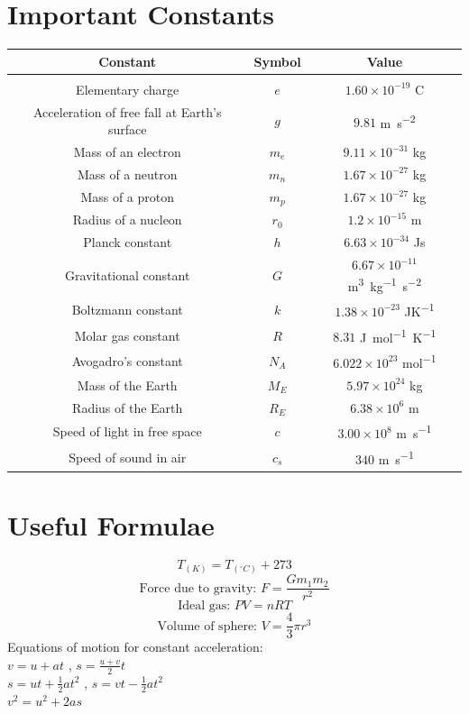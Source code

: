 \documentclass{exam}
\begin{document}
\section*{Important Constants}
\vspace{20pt}
\begin{tabular}{ c|c|c } 
    \textbf{Constant} & \textbf{Symbol} & \textbf{Value} \\ 
    \hline &&\\
    Elementary charge & $e$ & $1.60\times10^{-19}$ \si{C} \\
    Acceleration of free fall at Earth's surface & $g$ & $9.81$ \si{m.s^{-2}} \\
    Mass of an electron & $m_e$ & $9.11\times10^{-31}$ \si{kg} \\
    Mass of a neutron & $m_n$ & $1.67\times10^{-27}$ \si{kg} \\
    Mass of a proton & $m_p$ & $1.67\times10^{-27}$ \si{kg} \\
    Radius of a nucleon & $r_0$ & $1.2\times10^{-15}$ \si{m} \\
    Planck constant & $h$ & $6.63\times10^{-34}$ \si{Js} \\
    Gravitational constant & $G$ & $6.67\times10^{-11}$ \si{m^3.kg^{-1}.s^{-2}} \\
    Boltzmann constant & $k$ & $1.38\times10^{-23}$ \si{JK^{-1}} \\
    Molar gas constant & $R$ & $8.31$ \si{J.mol^{-1}.K^{-1}} \\
    Avogadro's constant & $N_A$ & $6.022\times10^{23}$ \si{mol^{-1}} \\
    Mass of the Earth & $M_E$ & $5.97\times10^{24}$ \si{kg} \\
    Radius of the Earth & $R_E$ & $6.38\times10^6$ \si{m} \\
    Speed of light in free space & $c$ & $3.00\times 10^8 $ \si{m.s^{-1}} \\
    Speed of sound in air & $c_s$ & $340$ \si{m.s^{-1}} \\
\end{tabular}

\newpage\centering
\section*{Useful Formulae}
$$ T_{(K)} = T_{(^\circ C)} + 273 $$
$$ \text{Force due to gravity: } F = \frac{Gm_1m_2}{r^2} $$
$$ \text{Ideal gas: } PV = nRT $$
$$ \text{Volume of sphere: } V = \frac{4}{3} \pi r^3 $$
\vspace{5pt}
Equations of motion for constant acceleration:\\
$v = u+at$ , $s = \frac{u+v}{2}t$\\
\vspace{5pt}
$s = ut + \frac{1}{2}at^2$ , $s = vt - \frac{1}{2}at^2$\\
\vspace{5pt}
$v^2 = u^2 + 2as$\\
\end{document}
